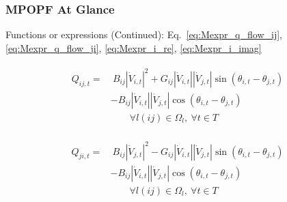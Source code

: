 \documentclass[
	11pt, %
	aspectratio=169, %
]{beamer}
\begin{document}
\begin{frame}
	\frametitle{MPOPF At Glance}
	
	Functions or expressions (Continued): Eq.~\eqref{eq:Mexpr_q_flow_ij},\eqref{eq:Mexpr_q_flow_ji}, \eqref{eq:Mexpr_i_re}, \eqref{eq:Mexpr_i_imag}
	
	\begin{align*}
		\begin{split}
			Q_{ij,t} =&\ B_{ij}\left\lvert \dot{V}_{i,t}\right\rvert^{2} + G_{ij}\left\lvert \dot{V}_{i,t}\right\rvert\left\lvert \dot{V}_{j,t}\right\rvert \sin{\left(\theta_{i,t}-\theta_{j,t}\right)} \\
			&- B_{ij}\left\lvert \dot{V}_{i,t}\right\rvert\left\lvert \dot{V}_{j,t}\right\rvert \cos{\left(\theta_{i,t}-\theta_{j,t}\right)}  \\[1em]
			&\qquad \forall l(ij) \in \Omega_{l},\ \forall t \in T
		\end{split}
	\end{align*}

	\begin{align*}
		\begin{split}
			Q_{ji,t} =&\ B_{ij}\left\lvert \dot{V}_{j,t}\right\rvert^{2} - G_{ij}\left\lvert \dot{V}_{i,t}\right\rvert\left\lvert \dot{V}_{j,t}\right\rvert \sin{\left(\theta_{i,t}-\theta_{j,t}\right)} \\
			&- B_{ij}\left\lvert \dot{V}_{i,t}\right\rvert\left\lvert \dot{V}_{j,t}\right\rvert \cos{\left(\theta_{i,t}-\theta_{j,t}\right)}  \\[1em]
			&\qquad \forall l(ij) \in \Omega_{l},\ \forall t \in T
		\end{split}
	\end{align*}
	

\end{frame}


\end{document}
